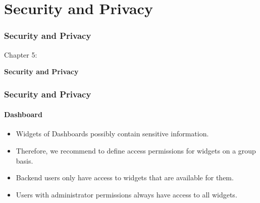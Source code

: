 %

\section{Security and Privacy}
\begin{frame}[fragile]
	\frametitle{Security and Privacy}

	\begin{center}\huge{Chapter 5:}\end{center}
	\begin{center}\huge{\color{typo3darkgrey}\textbf{Security and Privacy}}\end{center}

\end{frame}


\begin{frame}[fragile]
	\frametitle{Security and Privacy}
	\framesubtitle{Dashboard}

	\begin{itemize}
		\item Widgets of Dashboards possibly contain sensitive information.
		\item Therefore, we recommend to define access permissions for widgets on a group basis.
		\item Backend users only have access to widgets that are available for them.
		\item Users with administrator permissions always have access to all widgets.
	\end{itemize}

\end{frame}


